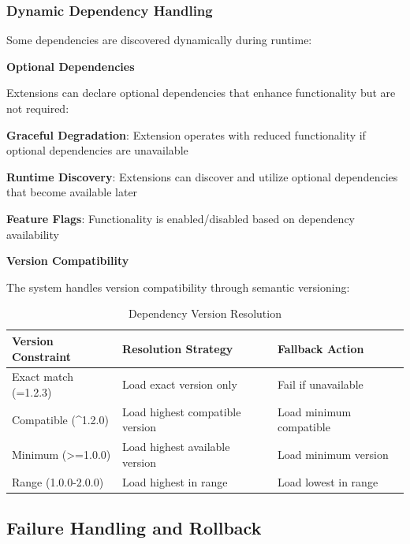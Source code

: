 \subsubsection{Dynamic Dependency Handling}

Some dependencies are discovered dynamically during runtime:

\textbf{Optional Dependencies}

Extensions can declare optional dependencies that enhance functionality but are not required:

\begin{compactlist}
    \item \textbf{Graceful Degradation}: Extension operates with reduced functionality if optional dependencies are unavailable
    \item \textbf{Runtime Discovery}: Extensions can discover and utilize optional dependencies that become available later
    \item \textbf{Feature Flags}: Functionality is enabled/disabled based on dependency availability
\end{compactlist}

\textbf{Version Compatibility}

The system handles version compatibility through semantic versioning:

\begin{table}[h]
\centering
\caption{Dependency Version Resolution}
\label{tab:version-resolution}
\begin{tabular}{@{}lll@{}}
\toprule
\textbf{Version Constraint} & \textbf{Resolution Strategy} & \textbf{Fallback Action} \\
\midrule
Exact match (=1.2.3) & Load exact version only & Fail if unavailable \\
Compatible (^1.2.0) & Load highest compatible version & Load minimum compatible \\
Minimum (>=1.0.0) & Load highest available version & Load minimum version \\
Range (1.0.0-2.0.0) & Load highest in range & Load lowest in range \\
\bottomrule
\end{tabular}
\end{table}

\subsection{Failure Handling and Rollback}
\label{subsec:failure-handling-rollback}


